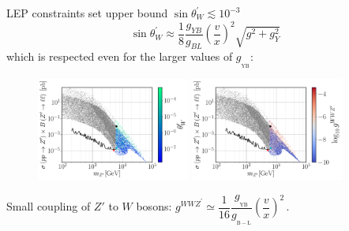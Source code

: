 \documentclass[10pt,xcolor=dvipsnames,mathserif]{beamer}
\newcommand{\g}[2]{g_{_\mathrm{#1}}^{#2}}
\begin{document}
\begin{frame}
	LEP constraints set upper bound $\sin \theta_W^\prime \lesssim 10^{-3}$
	$$\sin \theta_W^\prime \approx \dfrac{1}{8
	} \dfrac{g_{YB}}{g_{BL}}\left(\dfrac{v}{x}\right)^2 \sqrt{g^2 + g_Y^2}$$
which is respected even for the larger values of $\g{YB}{}$:	%
\begin{figure}[!h]
	\includegraphics[width=0.45\textwidth]{Images/BLSM_2/mZp_Xsec_twp.pdf}
	\includegraphics[width=0.45\textwidth]{Images/BLSM_2/mZp_Xsec_gWWZp.pdf}
\end{figure}	
Small coupling of $Z'$ to $W$ bosons: $g^{WWZ^\prime} \simeq \dfrac{1}{16} \dfrac{\g{YB}{}}{\g{B-L}{}} \left(\dfrac{v}{x}\right)^2\,.$
\end{frame}
\end{document}

